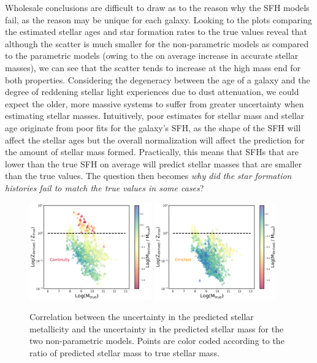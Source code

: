 \documentclass[twocolumn]{aastex62}
\begin{document}
Wholesale conclusions are difficult to draw as to the reason why the SFH models fail, as the reason may be unique for each galaxy. Looking to the plots comparing the estimated stellar ages and star formation rates to the true values reveal that although the scatter is much smaller for the non-parametric models as compared to the parametric models (owing to the on average increase in accurate stellar masses), we can see that the scatter tends to increase at the high mass end for both properties. Considering the degeneracy between the age of a galaxy and the degree of reddening stellar light experiences due to dust attenuation, we could expect the older, more massive systems to suffer from greater uncertainty when estimating stellar masses. Intuitively, poor estimates for stellar mass and stellar age originate from poor fits for the galaxy's SFH, as the shape of the SFH will affect the stellar ages but the overall normalization will affect the prediction for the amount of stellar mass formed. Practically, this means that SFHs that are lower than the true SFH on average will predict stellar masses that are smaller than the true values. The question then becomes \textit{why did the star formation histories fail to match the true values in some cases}? 

\begin{figure}[h!]

\centering
\includegraphics[width=0.47\textwidth]{Zratio_cont.png}\hfill
\includegraphics[width=0.47\textwidth]{Zratio_dir.png}

\caption{Correlation between the uncertainty in the predicted stellar metallicity and the uncertainty in the predicted stellar mass for the two non-parametric models. Points are color coded according to the ratio of predicted stellar mass to true stellar mass.}
\label{fig:zratio}
\end{figure}
\end{document}
